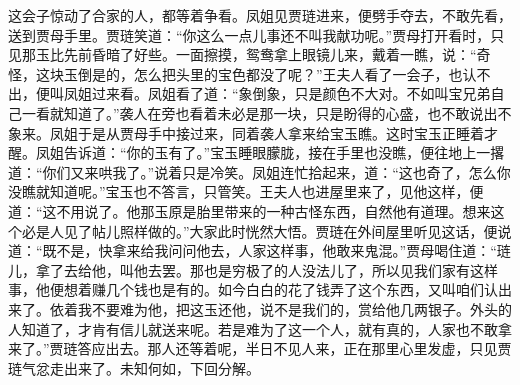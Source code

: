 \begin{parag}
    这会子惊动了合家的人，都等着争看。凤姐见贾琏进来，便劈手夺去，不敢先看，送到贾母手里。贾琏笑道：“你这么一点儿事还不叫我献功呢。”贾母打开看时，只见那玉比先前昏暗了好些。一面擦摸，鸳鸯拿上眼镜儿来，戴着一瞧，说：“奇怪，这块玉倒是的，怎么把头里的宝色都没了呢？”王夫人看了一会子，也认不出，便叫凤姐过来看。凤姐看了道：“象倒象，只是颜色不大对。不如叫宝兄弟自己一看就知道了。”袭人在旁也看着未必是那一块，只是盼得的心盛，也不敢说出不象来。凤姐于是从贾母手中接过来，同着袭人拿来给宝玉瞧。这时宝玉正睡着才醒。凤姐告诉道：“你的玉有了。”宝玉睡眼朦胧，接在手里也没瞧，便往地上一撂道：“你们又来哄我了。”说着只是冷笑。凤姐连忙拾起来，道：“这也奇了，怎么你没瞧就知道呢。”宝玉也不答言，只管笑。王夫人也进屋里来了，见他这样，便道：“这不用说了。他那玉原是胎里带来的一种古怪东西，自然他有道理。想来这个必是人见了帖儿照样做的。”大家此时恍然大悟。贾琏在外间屋里听见这话，便说道：“既不是，快拿来给我问问他去，人家这样事，他敢来鬼混。”贾母喝住道：“琏儿，拿了去给他，叫他去罢。那也是穷极了的人没法儿了，所以见我们家有这样事，他便想着赚几个钱也是有的。如今白白的花了钱弄了这个东西，又叫咱们认出来了。依着我不要难为他，把这玉还他，说不是我们的，赏给他几两银子。外头的人知道了，才肯有信儿就送来呢。若是难为了这一个人，就有真的，人家也不敢拿来了。”贾琏答应出去。那人还等着呢，半日不见人来，正在那里心里发虚，只见贾琏气忿走出来了。未知何如，下回分解。
\end{parag}